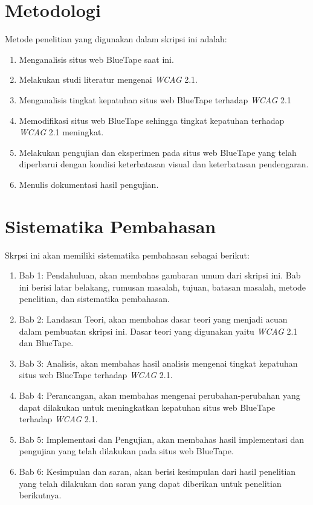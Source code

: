 \section{Metodologi}
\label{sec:metlit}
Metode penelitian yang digunakan dalam skripsi ini adalah:
\begin{enumerate}
	\item Menganalisis situs web BlueTape saat ini. 
	\item Melakukan studi literatur mengenai \textit{WCAG} 2.1.
	\item Menganalisis tingkat kepatuhan situs web BlueTape terhadap \textit{WCAG} 2.1
	\item Memodifikasi situs web BlueTape sehingga tingkat kepatuhan terhadap \textit{WCAG} 2.1 meningkat.
	\item Melakukan pengujian dan eksperimen pada situs web BlueTape yang telah diperbarui dengan kondisi keterbatasan visual dan keterbatasan pendengaran.
	\item Menulis dokumentasi hasil pengujian.
\end{enumerate}

\section{Sistematika Pembahasan}
\label{sec:sispem}
Skrpsi ini akan memiliki sistematika pembahasan sebagai berikut: 
\begin{enumerate}
	\item Bab 1: Pendahuluan, akan membahas gambaran umum dari skripsi ini. Bab ini berisi latar belakang, rumusan masalah, tujuan, batasan masalah, metode penelitian, dan sistematika pembahasan.
	\item Bab 2: Landasan Teori, akan membahas dasar teori yang menjadi acuan dalam pembuatan skripsi ini. Dasar teori yang digunakan yaitu \textit{WCAG} 2.1 dan BlueTape.
	\item Bab 3: Analisis, akan membahas hasil analisis mengenai tingkat kepatuhan situs web BlueTape terhadap \textit{WCAG} 2.1.
	\item Bab 4: Perancangan, akan membahas mengenai perubahan-perubahan yang dapat dilakukan untuk meningkatkan kepatuhan situs web BlueTape terhadap \textit{WCAG} 2.1.
	\item Bab 5: Implementasi dan Pengujian, akan membahas hasil implementasi dan pengujian yang telah dilakukan pada situs web BlueTape.
	\item Bab 6: Kesimpulan dan saran, akan berisi kesimpulan dari hasil penelitian yang telah dilakukan dan saran yang dapat diberikan untuk penelitian berikutnya.
\end{enumerate}
